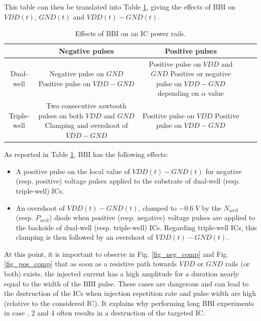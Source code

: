 \documentclass[10pt, conference, compsocconf]{IEEEtran}
\begin{document}
This table can then be translated into Table \ref{table3}, giving the effects of BBI on $VDD(t)$, $GND(t)$ and $VDD(t) - GND(t)$.
\begin{table}[!t]
\centering
\renewcommand{\arraystretch}{2.5}
\caption{Effects of BBI on an IC power rails.}
\label{table3}
\centering
\begin{tabular}{|c||c|c|c|c|}
\hline
& Negative pulses & Positive pulses\\
\hline
Dual-well &
\makecell{Negative pulse on $GND$\\Positive pulse on $VDD-GND$} &
\makecell{Positive pulse on $VDD$ and $GND$\\Positive or negative pulse on $VDD-GND$ depending on $\alpha$ value}\\
\hline
Triple-well &
\makecell{Two consecutive sawtooth pulses on both $VDD$ and $GND$\\Clamping and overshoot of $VDD-GND$} &
\makecell{Positive pulse on $VDD$\\Positive pulse on $VDD-GND$}\\
\hline
\end{tabular}
\end{table}
As reported in Table \ref{table3}, BBI has the following effects:
\begin{itemize}
    \item A positive pulse on the local value of $VDD(t) - GND(t)$ for negative (resp. positive) voltage pulses applied to the substrate of dual-well (resp. triple-well) ICs.
    \item An overshoot of $VDD(t) - GND(t)$, clamped to $-0.6 \; V$ by the $N_{well}$ (resp. $P_{well}$) diode when positive (resp. negative) voltage pulses are applied to the backside of dual-well (resp. triple-well) ICs. Regarding triple-well ICs, this clamping is then followed by an overshoot of $VDD(t) - GND(t)$.
\end{itemize}

At this point, it is important to observe in Fig. \ref{fig_neg_comp} and Fig. \ref{fig_pos_comp} that as soon as a resistive path towards $VDD$ or $GND$ rails (or both) exists, the injected current has a high amplitude for a duration nearly equal to the width of the BBI pulse. These cases are dangerous and can lead to the destruction of the ICs when injection repetition rate and pulse width are high (relative to the considered IC). It explains why performing long BBI experiments in case , 2 and 4 often results in a destruction of the targeted IC.
\end{document}
